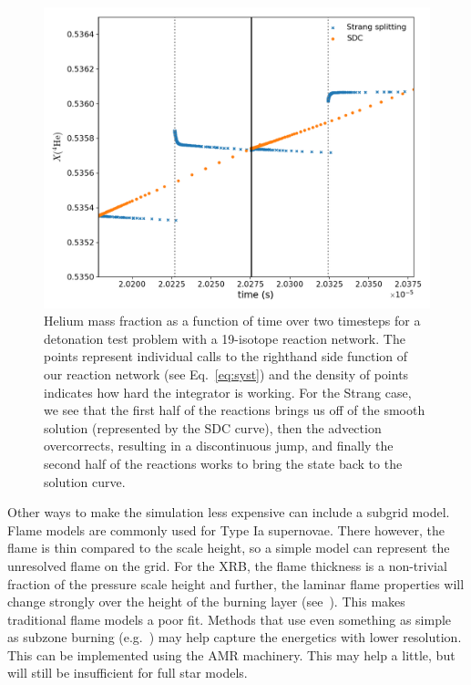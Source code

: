 \documentclass[a4paper]{jpconf}
\begin{document}
\begin{figure}
\centering
\includegraphics[width=0.75\linewidth]{sdc_plot}
\caption{\label{fig:sdc} Helium mass fraction as a function of time
  over two timesteps for a detonation test problem with a 19-isotope
  reaction network.  The points represent individual calls to the
  righthand side function of our reaction network (see
  Eq.~\ref{eq:syst}) and the density of points indicates how hard the
  integrator is working.  For the Strang case, we see that the first
  half of the reactions brings us off of the smooth solution
  (represented by the SDC curve), then the advection overcorrects,
  resulting in a discontinuous jump, and finally the second half of
  the reactions works to bring the state back to the solution curve.}
\end{figure}

Other ways to make the simulation less expensive can include a subgrid
model. Flame models are commonly used for Type Ia supernovae.  There
however, the flame is thin compared to the scale height, so a simple
model can represent the unresolved flame on the grid.  For the XRB,
the flame thickness is a non-trivial fraction of the pressure scale
height and further, the laminar flame properties will change strongly
over the height of the burning layer (see~\cite{Timmes00}).  This
makes traditional flame models a poor fit.  Methods that use even
something as simple as subzone burning (e.g.~\cite{Wang2012190}) may
help capture the energetics with lower resolution.  This can be
implemented using the AMR machinery.  This may help a little, but will
still be insufficient for full star models.
\end{document}
